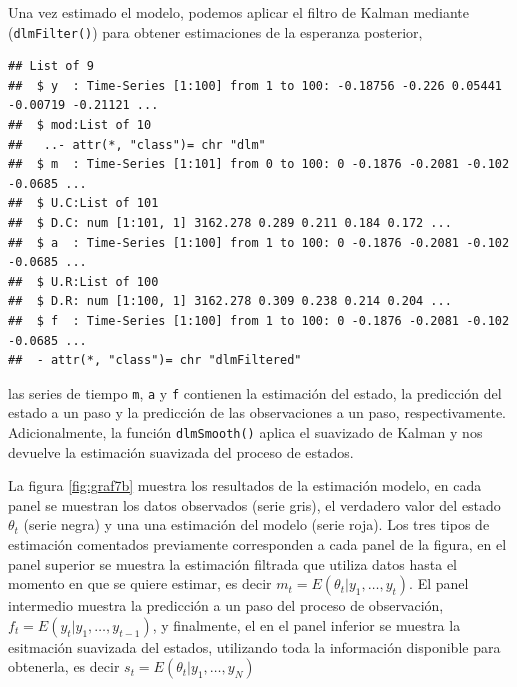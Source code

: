 \documentclass[12pt]{article}\usepackage[]{graphicx}\usepackage[]{color}
\makeatletter
\newenvironment{kframe}{%
 \def\at@end@of@kframe{}%
 \ifinner\ifhmode%
  \def\at@end@of@kframe{\end{minipage}}%
  \begin{minipage}{\columnwidth}%
 \fi\fi%
 \def\FrameCommand##1{\hskip\@totalleftmargin \hskip-\fboxsep
 \colorbox{shadecolor}{##1}\hskip-\fboxsep
     \hskip-\linewidth \hskip-\@totalleftmargin \hskip\columnwidth}%
 \MakeFramed {\advance\hsize-\width
   \@totalleftmargin\z@ \linewidth\hsize
   \@setminipage}}%
 {\par\unskip\endMakeFramed%
 \at@end@of@kframe}
\newenvironment{knitrout}{}{} %
\makeatother
\begin{document}
Una vez estimado el modelo, podemos aplicar el filtro de Kalman mediante (\verb|dlmFilter()|) para obtener estimaciones de la esperanza posterior,
\begin{knitrout}
\color{fgcolor}\begin{kframe}
\begin{verbatim}
## List of 9
##  $ y  : Time-Series [1:100] from 1 to 100: -0.18756 -0.226 0.05441 -0.00719 -0.21121 ...
##  $ mod:List of 10
##   ..- attr(*, "class")= chr "dlm"
##  $ m  : Time-Series [1:101] from 0 to 100: 0 -0.1876 -0.2081 -0.102 -0.0685 ...
##  $ U.C:List of 101
##  $ D.C: num [1:101, 1] 3162.278 0.289 0.211 0.184 0.172 ...
##  $ a  : Time-Series [1:100] from 1 to 100: 0 -0.1876 -0.2081 -0.102 -0.0685 ...
##  $ U.R:List of 100
##  $ D.R: num [1:100, 1] 3162.278 0.309 0.238 0.214 0.204 ...
##  $ f  : Time-Series [1:100] from 1 to 100: 0 -0.1876 -0.2081 -0.102 -0.0685 ...
##  - attr(*, "class")= chr "dlmFiltered"
\end{verbatim}
\end{kframe}
\end{knitrout}
las series de tiempo \verb|m|, \verb|a| y \verb|f| contienen la estimación del estado, la predicción del estado a un paso y la predicción de las observaciones a un paso, respectivamente. Adicionalmente, la función \verb|dlmSmooth()| aplica el suavizado de Kalman y nos devuelve la estimación suavizada del proceso de estados.

La figura \ref{fig:graf7b} muestra los resultados de la estimación modelo, en cada panel se muestran los datos observados (serie gris), el verdadero valor del estado $\theta_t$ (serie negra) y una una estimación del modelo (serie roja). Los tres tipos de estimación comentados previamente corresponden a cada panel de la figura, en el panel superior se muestra la estimación filtrada que utiliza datos hasta el momento en que se quiere estimar, es decir $m_t = E(\theta_t | y_1,\ldots, y_t)$. El panel intermedio muestra la predicción a un paso del proceso de observación, $f_t = E(y_t | y_1, \ldots, y_{t-1})$, y finalmente, el en el panel inferior se muestra la esitmación suavizada del estados, utilizando toda la información disponible para obtenerla, es decir $s_t = E(\theta_t | y_1, \ldots, y_N)$
\end{document}
